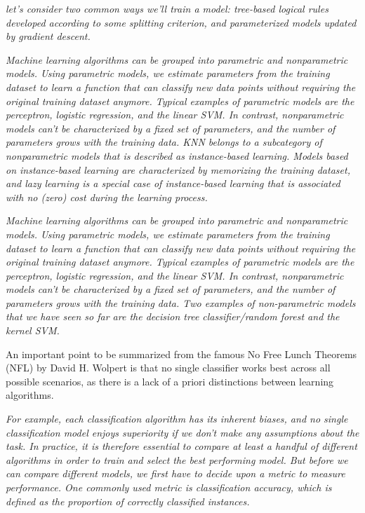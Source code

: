 \textit{let's consider two common ways we'll train a model: tree-based logical rules developed according to some splitting criterion, and parameterized models updated by gradient descent.}

\textit{Machine learning algorithms can be grouped into parametric and nonparametric models. Using parametric models, we estimate parameters from the training dataset to learn a function that can classify new data points without requiring the original training dataset anymore. Typical examples of parametric models are the perceptron, logistic regression, and the linear SVM. In contrast, nonparametric models can't be characterized by a fixed set of parameters, and the number of parameters grows with the training data. KNN belongs to a subcategory of nonparametric models that is described as instance-based learning. Models based on instance-based learning are characterized by memorizing the training dataset, and lazy learning is a special case of instance-based learning that is associated with no (zero) cost during the learning process.}

\textit{Machine learning algorithms can be grouped into parametric and nonparametric models. Using parametric models, we estimate parameters from the training dataset to learn a function that can classify new data points without requiring the original training dataset anymore. Typical examples of parametric models are the perceptron, logistic regression, and the linear SVM. In contrast, nonparametric models can't be characterized by a fixed set of parameters, and the number of parameters grows with the training data. Two examples of non-parametric models that we have seen so far are the decision tree classifier/random forest and the kernel SVM.}

An important point to be summarized from the famous No Free Lunch Theorems (NFL)\cite{Wolpert1996,Wolpert1997} by David H. Wolpert is that no single classifier works best across all possible scenarios, as there is a lack of a priori distinctions between learning algorithms.

\textit{For example, each classification algorithm has its inherent biases, and no single classification model enjoys superiority if we don't make any assumptions about the task. In practice, it is therefore essential to compare at least a handful of different algorithms in order to train and select the best performing model. But before we can compare different models, we first have to decide upon a metric to measure performance. One commonly used metric is classification accuracy, which is defined as the proportion of correctly classified instances.}

